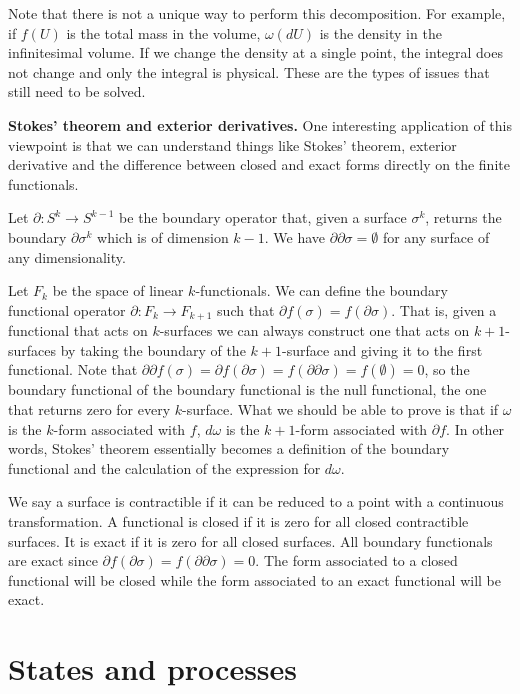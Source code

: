 \documentclass[11pt,letterpaper,fleqn]{memoir} %
\begin{document}
Note that there is not a unique way to perform this decomposition. For example, if $f(U)$ is the total mass in the volume, $\omega(dU)$ is the density in the infinitesimal volume. If we change the density at a single point, the integral does not change and only the integral is physical. These are the types of issues that still need to be solved.

\textbf{Stokes' theorem and exterior derivatives.} One interesting application of this viewpoint is that we can understand things like Stokes' theorem, exterior derivative and the difference between closed and exact forms directly on the finite functionals.

Let $\partial : S^k \to S^{k-1}$ be the boundary operator that, given a surface $\sigma^k$, returns the boundary $\partial \sigma^k$ which is of dimension $k-1$. We have $\partial\partial\sigma = \emptyset$ for any surface of any dimensionality.

Let $F_k$ be the space of linear $k$-functionals. We can define the boundary functional operator $\partial : F_k \to F_{k+1}$ such that $\partial f(\sigma) = f(\partial \sigma)$. That is, given a functional that acts on $k$-surfaces we can always construct one that acts on $k+1$-surfaces by taking the boundary of the $k+1$-surface and giving it to the first functional. Note that $\partial\partial f(\sigma) = \partial f(\partial\sigma) =  f(\partial\partial\sigma) = f(\emptyset) = 0$, so the boundary functional of the boundary functional is the null functional, the one that returns zero for every $k$-surface. What we should be able to prove is that if $\omega$ is the $k$-form associated with $f$, $d\omega$ is the $k+1$-form associated with $\partial f$. In other words, Stokes' theorem essentially becomes a definition of the boundary functional and the calculation of the expression for $d\omega$.

We say a surface is contractible if it can be reduced to a point with a continuous transformation. A functional is closed if it is zero for all closed contractible surfaces. It is exact if it is zero for all closed surfaces. All boundary functionals are exact since $\partial f (\partial \sigma) =  f (\partial\partial \sigma) = 0$. The form associated to a closed functional will be closed while the form associated to an exact functional will be exact.

\section{States and processes}
\end{document}
